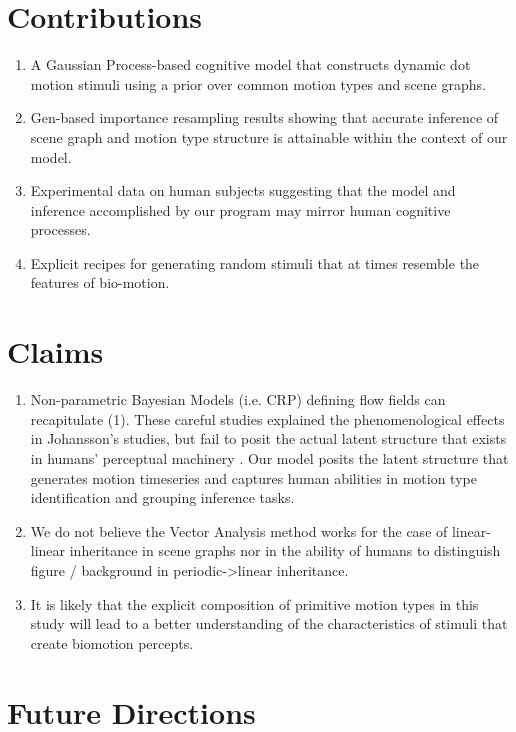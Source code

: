 \documentclass{scrartcl}
\begin{document}
\section{Contributions}

\begin{enumerate}
  \item A Gaussian Process-based cognitive model that constructs dynamic dot motion stimuli using a prior over common motion types and scene graphs. \cite{Saad_2019}
  \item Gen-based importance resampling results showing that accurate inference of scene graph and motion type structure is attainable within the context of our model. 
  \item Experimental data on human subjects suggesting that the model and inference accomplished by our program may mirror human cognitive processes.
  \item Explicit recipes for generating random stimuli that at times resemble the features of bio-motion.
\end{enumerate}    

\section{Claims}

\begin{enumerate}
  \item Non-parametric Bayesian Models (i.e. CRP) defining flow fields can recapitulate (1). These careful studies explained the phenomenological effects in Johansson's studies, but fail to posit the actual latent structure that exists in humans' perceptual machinery \cite{Gershman_2016}. Our model posits the latent structure that generates motion timeseries and captures human abilities in motion type identification and grouping inference tasks.
  \item We do not believe the Vector Analysis method works for the case of linear-linear inheritance in scene graphs nor in the ability of humans to distinguish figure / background in periodic->linear inheritance.
  \item It is likely that the explicit composition of primitive motion types in this study will lead to a better understanding of the characteristics of stimuli that create biomotion percepts. 
\end{enumerate}

\section{Future Directions}
\end{document}
